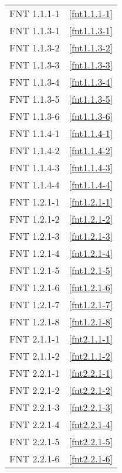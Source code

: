\begin{multicols}{2}
\begin{center}
\columnbreak

\begingroup
	\tablelasttail{%
		\hline\hline
		}
\begin{supertabular}{cc}
	FNT 1.1.1-1	&	\ref{fnt1.1.1-1}\\
	FNT 1.1.3-1	&	\ref{fnt1.1.3-1}\\
	FNT 1.1.3-2	&	\ref{fnt1.1.3-2}\\
	FNT 1.1.3-3	&	\ref{fnt1.1.3-3}\\
	FNT 1.1.3-4	&	\ref{fnt1.1.3-4}\\
	FNT 1.1.3-5	&	\ref{fnt1.1.3-5}\\
	FNT 1.1.3-6	&	\ref{fnt1.1.3-6}\\
	FNT 1.1.4-1	&	\ref{fnt1.1.4-1}\\
	FNT 1.1.4-2	&	\ref{fnt1.1.4-2}\\
	FNT 1.1.4-3	&	\ref{fnt1.1.4-3}\\
	FNT 1.1.4-4	&	\ref{fnt1.1.4-4}\\
	\hline
	FNT 1.2.1-1	&	\ref{fnt1.2.1-1}\\
	FNT 1.2.1-2	&	\ref{fnt1.2.1-2}\\
	FNT 1.2.1-3	&	\ref{fnt1.2.1-3}\\
	FNT 1.2.1-4	&	\ref{fnt1.2.1-4}\\
	FNT 1.2.1-5	&	\ref{fnt1.2.1-5}\\
	FNT 1.2.1-6	&	\ref{fnt1.2.1-6}\\
	FNT 1.2.1-7	&	\ref{fnt1.2.1-7}\\
	FNT 1.2.1-8	&	\ref{fnt1.2.1-8}\\
	\hline\hline
	FNT 2.1.1-1	&	\ref{fnt2.1.1-1}\\
	FNT 2.1.1-2	&	\ref{fnt2.1.1-2}\\
	\hline
	FNT 2.2.1-1	&	\ref{fnt2.2.1-1}\\
	FNT 2.2.1-2	&	\ref{fnt2.2.1-2}\\
	FNT 2.2.1-3	&	\ref{fnt2.2.1-3}\\
	FNT 2.2.1-4	&	\ref{fnt2.2.1-4}\\
	FNT 2.2.1-5	&	\ref{fnt2.2.1-5}\\
	FNT 2.2.1-6	&	\ref{fnt2.2.1-6}\\

\end{supertabular}
\end{center}
\end{multicols}
